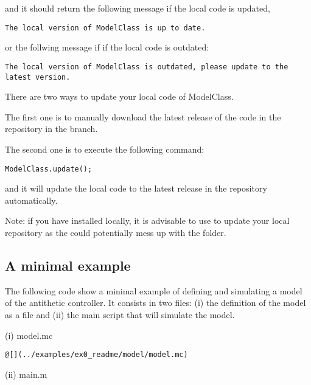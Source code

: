 \documentclass[11pt]{article}
\begin{document}
and it should return the following message if the local code is updated,

\begin{lstlisting}
The local version of ModelClass is up to date.
\end{lstlisting}

or the follwing message if if the local code is outdated:

\begin{lstlisting}
The local version of ModelClass is outdated, please update to the latest version.
\end{lstlisting}

There are two ways to update your local code of ModelClass.

The first one is to manually download the latest release of the code in the repository in the  branch.

The second one is to execute the following command:

\begin{lstlisting}
ModelClass.update();
\end{lstlisting}

and it will update the local code to the latest release in the repository automatically. 

Note: if you have  installed locally, it is advisable to use  to update your local repository as the  could potentially mess up with the  folder.

\subsection{A minimal example}

The following code show a minimal example of defining and simulating a model of the antithetic controller. It consists in two files: (i) the definition of the model as a  file and (ii) the main script that will simulate the model. 

(i) model.mc 

\begin{lstlisting}
@[](../examples/ex0_readme/model/model.mc)
\end{lstlisting}

(ii) main.m
\end{document}
